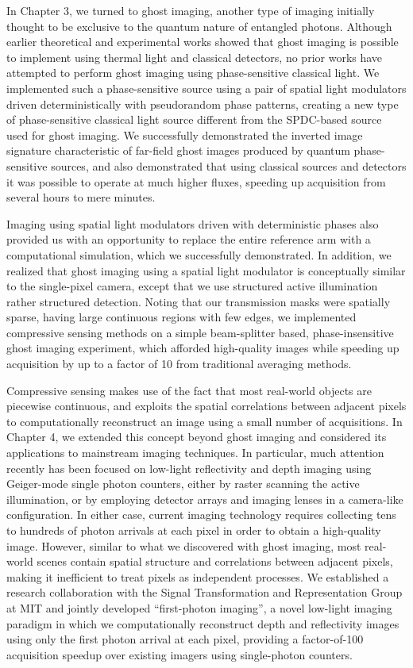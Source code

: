 In Chapter 3, we turned to ghost imaging, another type of imaging initially thought to be exclusive to the quantum nature of entangled photons. Although earlier theoretical and experimental works showed that ghost imaging is possible to implement using thermal light and classical detectors, no prior works have attempted to perform ghost imaging using phase-sensitive classical light. We implemented such a phase-sensitive source using a pair of spatial light modulators driven deterministically with pseudorandom phase patterns, creating a new type of phase-sensitive classical light source different from the SPDC-based source used for ghost imaging. We successfully demonstrated the inverted image signature characteristic of far-field ghost images produced by quantum phase-sensitive sources, and also demonstrated that using classical sources and detectors it was possible to operate at much higher fluxes, speeding up acquisition from several hours to mere minutes.

Imaging using spatial light modulators driven with deterministic phases also provided us with an opportunity to replace the entire reference arm with a computational simulation, which we successfully demonstrated. In addition, we realized that ghost imaging using a spatial light modulator is conceptually similar to the single-pixel camera, except that we use structured active illumination rather structured detection. Noting that our transmission masks were spatially sparse, having large continuous regions with few edges, we implemented compressive sensing methods on a simple beam-splitter based, phase-insensitive ghost imaging experiment, which afforded high-quality images while speeding up acquisition by up to a factor of 10 from traditional averaging methods.

Compressive sensing makes use of the fact that most real-world objects are piecewise continuous, and exploits the spatial correlations between adjacent pixels to computationally reconstruct an image using a small number of acquisitions. In Chapter 4, we extended this concept beyond ghost imaging and considered its applications to mainstream imaging techniques. In particular, much attention recently has been focused on low-light reflectivity and depth imaging using Geiger-mode single photon counters, either by raster scanning the active illumination, or by employing detector arrays and imaging lenses in a camera-like configuration. In either case, current imaging technology requires collecting tens to hundreds of photon arrivals at each pixel in order to obtain a high-quality image. However, similar to what we discovered with ghost imaging, most real-world scenes contain spatial structure and correlations between adjacent pixels, making it inefficient to treat pixels as independent processes. We established a research collaboration with the Signal Transformation and Representation Group at MIT and jointly developed ``first-photon imaging'', a novel low-light imaging paradigm in which we computationally reconstruct depth and reflectivity images using only the first photon arrival at each pixel, providing a factor-of-100 acquisition speedup over existing imagers using single-photon counters.

